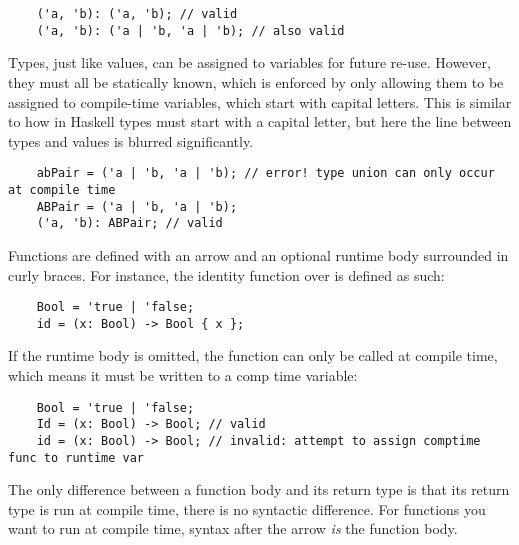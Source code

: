 \documentclass[12pt,twoside]{report}
\begin{document}
\begin{listing}[H]
  \begin{verbatim}
    ('a, 'b): ('a, 'b); // valid
    ('a, 'b): ('a | 'b, 'a | 'b); // also valid
  \end{verbatim}
\end{listing}

Types, just like values, can be assigned to variables for future re-use. However, they must all be statically known, which is enforced by only allowing them to be assigned to compile-time variables, which start with capital letters. This is similar to how in Haskell types must start with a capital letter, but here the line between types and values is blurred significantly.

\begin{listing}[H]
  \begin{verbatim}
    abPair = ('a | 'b, 'a | 'b); // error! type union can only occur at compile time
    ABPair = ('a | 'b, 'a | 'b);
    ('a, 'b): ABPair; // valid
  \end{verbatim}
\end{listing}

Functions are defined with an arrow \mono{->} and an optional runtime body surrounded in curly braces. For instance, the identity function over  is defined as such:

\begin{listing}[H]
  \begin{verbatim}
    Bool = 'true | 'false;
    id = (x: Bool) -> Bool { x };
  \end{verbatim}
\end{listing}

If the runtime body is omitted, the function can only be called at compile time, which means it must be written to a comp time variable:

\begin{listing}[H]
  \begin{verbatim}
    Bool = 'true | 'false;
    Id = (x: Bool) -> Bool; // valid
    id = (x: Bool) -> Bool; // invalid: attempt to assign comptime func to runtime var
  \end{verbatim}
\end{listing}

The only difference between a function body and its return type is that its return type is run at compile time, there is no syntactic difference. For functions you want to run at compile time, syntax after the arrow \textit{is} the function body.
\end{document}
